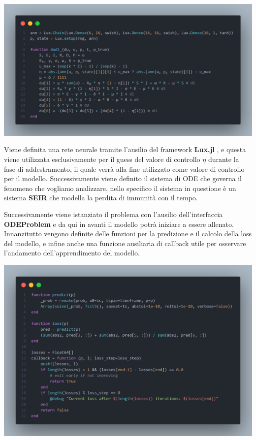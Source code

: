 \begin{minipage}{\linewidth}
	\centering
	\includegraphics[width=\textwidth]{img/controller1.png}
	\label{fig:controller1}
\end{minipage}

Viene definita una rete neurale tramite l'ausilio del framework \textbf{Lux.jl} \cite{pal2023lux}, e questa viene utilizzata
esclusivamente per il guess del valore di controllo $\eta$ durante la fase di addestramento, il quale verrà 
alla fine utilizzato come valore di controllo per il modello. Successivamente viene definito il sistema di ODE che governa il fenomeno che vogliamo analizzare, nello specifico il sistema in 
questione è un sistema \textbf{SEIR} che modella la perdita di immunità con il tempo. 

Successivamente viene istanziato il problema con l'ausilio dell'interfaccia \textbf{ODEProblem} e da qui in avanti il modello potrà iniziare a 
essere allenato. Innanzitutto vengono definite delle funzioni per la predizione e il calcolo della loss del modello, 
e infine anche una funzione ausiliaria di callback utile per osservare l'andamento dell'apprendimento del modello.

\begin{minipage}{\linewidth}
	\centering
	\includegraphics[width=\textwidth]{img/controller2.png}
	\label{fig:controller2}
\end{minipage}

